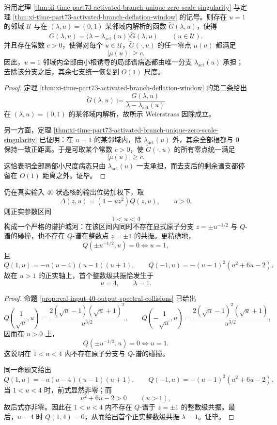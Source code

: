 \begin{corollary}[围绕 \texorpdfstring{$u=1$}{u=1} 的局部谱病态完全由唯一激活小根承担]\label{cor:xi-time-part73-single-activated-branch-all-local-illconditioning}
沿用定理 \ref{thm:xi-time-part73-activated-branch-unique-zero-scale-singularity} 与定理 \ref{thm:xi-time-part73-activated-branch-deflation-window} 的记号。则存在 \(u=1\) 的邻域 \(\mathcal U\) 与在 \((\lambda,u)=(0,1)\) 某邻域内解析的函数 \(\widetilde G(\lambda,u)\)，使得
\[
G(\lambda,u)=\bigl(\lambda-\lambda_{\mathrm{act}}(u)\bigr)\widetilde G(\lambda,u)
\qquad(u\in\mathcal U).
\]
并且存在常数 \(c>0\)，使得对每个 \(u\in\mathcal U\)，\(\widetilde G(\cdot,u)\) 的任一零点 \(\mu(u)\) 都满足
\[
|\mu(u)|\ge c.
\]
因此，\(u=1\) 邻域内全部由小根诱导的局部谱病态都由唯一分支 \(\lambda_{\mathrm{act}}(u)\) 承担；去除该分支之后，其余七支统一恢复到 \(O(1)\) 尺度。
\end{corollary}
\begin{proof}
定理 \ref{thm:xi-time-part73-activated-branch-deflation-window} 的第二条给出
\[
\widetilde G(\lambda,u):=\frac{G(\lambda,u)}{\lambda-\lambda_{\mathrm{act}}(u)}
\]
在 \((\lambda,u)=(0,1)\) 的某邻域内解析，故所示 Weierstrass 因除成立。

另一方面，定理 \ref{thm:xi-time-part73-activated-branch-unique-zero-scale-singularity} 已证明：在 \(u=1\) 的某邻域内，除 \(\lambda_{\mathrm{act}}(u)\) 外，其余全部根都与 \(0\) 保持一致正距离。于是可取某个常数 \(c>0\)，使 \(\widetilde G(\cdot,u)\) 的所有零点统一满足
\[
|\mu(u)|\ge c.
\]
这恰表明全部局部小尺度病态只由 \(\lambda_{\mathrm{act}}(u)\) 一支承担，而去支后的剩余谱支都停留在 \(O(1)\) 距离之外。证毕。
\end{proof}

\begin{theorem}\label{thm:xi-time-part73-positive-real-spectral-moat}
仍在真实输入 \(40\) 状态核的输出位势加权下，取
\[
\Delta(z,u)=(1-uz^2)Q(z,u),
\qquad
u>0.
\]
则正实参数区间
\[
1<u<4
\]
构成一个严格的谱护城河：在该区间内同时不存在显式原子分支 \(z=\pm u^{-1/2}\) 与 \(Q\)-谱的碰撞，也不存在 \(Q\)-谱在整数点 \(z=\pm1\) 的共振。更精确地，
\[
Q(\pm u^{-1/2},u)=0
\iff
u=1,
\]
且
\[
Q(1,u)=-u(u-4)(u-1)(u+1),
\qquad
Q(-1,u)=-(u-1)^2(u^2+6u-2).
\]
故在 \(u>1\) 的正实轴上，首个整数级共振恰发生于
\[
u=4,
\qquad
\lambda=1.
\]
\end{theorem}
\begin{proof}
命题 \ref{prop:real-input-40-output-spectral-collisions} 已给出
\[
Q\!\left(\frac{1}{\sqrt u},u\right)=\frac{2(\sqrt u-1)(\sqrt u+1)^2}{u^{3/2}},
\qquad
Q\!\left(-\frac{1}{\sqrt u},u\right)=\frac{2(\sqrt u-1)^2(\sqrt u+1)}{u^{3/2}},
\]
因而在 \(u>0\) 上，
\[
Q(\pm u^{-1/2},u)=0 \iff u=1.
\]
这说明在 \(1<u<4\) 内不存在原子分支与 \(Q\)-谱的碰撞。

同一命题又给出
\[
Q(1,u)=-u(u-4)(u-1)(u+1),
\qquad
Q(-1,u)=-(u-1)^2(u^2+6u-2).
\]
当 \(1<u<4\) 时，前式显然非零；而
\[
u^2+6u-2>0
\qquad (u>1),
\]
故后式亦非零。因此在 \(1<u<4\) 内不存在 \(Q\)-谱于 \(z=\pm1\) 的整数级共振。最后，\(u=4\) 时 \(Q(1,4)=0\)，从而给出首个正实整数级共振 \(\lambda=1\)。证毕。
\end{proof}

